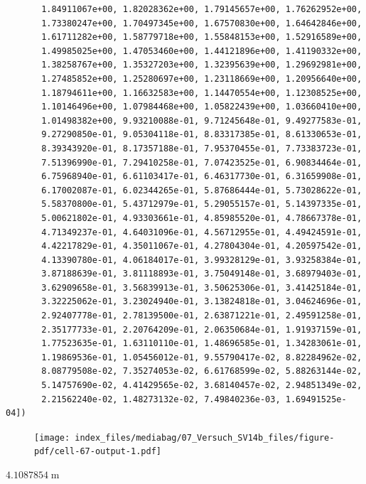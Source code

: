 \documentclass[
  letterpaper,
]{scrreprt}
\begin{document}
\begin{verbatim}
       1.84911067e+00, 1.82028362e+00, 1.79145657e+00, 1.76262952e+00,
       1.73380247e+00, 1.70497345e+00, 1.67570830e+00, 1.64642846e+00,
       1.61711282e+00, 1.58779718e+00, 1.55848153e+00, 1.52916589e+00,
       1.49985025e+00, 1.47053460e+00, 1.44121896e+00, 1.41190332e+00,
       1.38258767e+00, 1.35327203e+00, 1.32395639e+00, 1.29692981e+00,
       1.27485852e+00, 1.25280697e+00, 1.23118669e+00, 1.20956640e+00,
       1.18794611e+00, 1.16632583e+00, 1.14470554e+00, 1.12308525e+00,
       1.10146496e+00, 1.07984468e+00, 1.05822439e+00, 1.03660410e+00,
       1.01498382e+00, 9.93210088e-01, 9.71245648e-01, 9.49277583e-01,
       9.27290850e-01, 9.05304118e-01, 8.83317385e-01, 8.61330653e-01,
       8.39343920e-01, 8.17357188e-01, 7.95370455e-01, 7.73383723e-01,
       7.51396990e-01, 7.29410258e-01, 7.07423525e-01, 6.90834464e-01,
       6.75968940e-01, 6.61103417e-01, 6.46317730e-01, 6.31659908e-01,
       6.17002087e-01, 6.02344265e-01, 5.87686444e-01, 5.73028622e-01,
       5.58370800e-01, 5.43712979e-01, 5.29055157e-01, 5.14397335e-01,
       5.00621802e-01, 4.93303661e-01, 4.85985520e-01, 4.78667378e-01,
       4.71349237e-01, 4.64031096e-01, 4.56712955e-01, 4.49424591e-01,
       4.42217829e-01, 4.35011067e-01, 4.27804304e-01, 4.20597542e-01,
       4.13390780e-01, 4.06184017e-01, 3.99328129e-01, 3.93258384e-01,
       3.87188639e-01, 3.81118893e-01, 3.75049148e-01, 3.68979403e-01,
       3.62909658e-01, 3.56839913e-01, 3.50625306e-01, 3.41425184e-01,
       3.32225062e-01, 3.23024940e-01, 3.13824818e-01, 3.04624696e-01,
       2.92407778e-01, 2.78139500e-01, 2.63871221e-01, 2.49591258e-01,
       2.35177733e-01, 2.20764209e-01, 2.06350684e-01, 1.91937159e-01,
       1.77523635e-01, 1.63110110e-01, 1.48696585e-01, 1.34283061e-01,
       1.19869536e-01, 1.05456012e-01, 9.55790417e-02, 8.82284962e-02,
       8.08779508e-02, 7.35274053e-02, 6.61768599e-02, 5.88263144e-02,
       5.14757690e-02, 4.41429565e-02, 3.68140457e-02, 2.94851349e-02,
       2.21562240e-02, 1.48273132e-02, 7.49840236e-03, 1.69491525e-04])
\end{verbatim}

\begin{figure}[H]

{\centering \texttt{[image: index\_files/mediabag/07\_Versuch\_SV14b\_files/figure-pdf/cell-67-output-1.pdf]}

}

\end{figure}

$4.1087854 \; \mathrm{m}$
\end{document}
